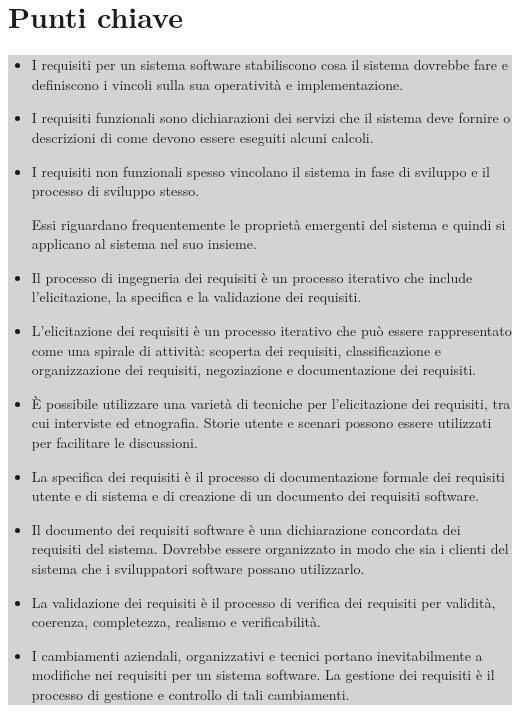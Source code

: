 \section{Punti chiave}
\begin{center}
\begin{minipage}{\textwidth}
\colorbox{lightgray}{
\parbox{\linewidth}{
\begin{itemize} 
    \item I requisiti per un sistema software stabiliscono cosa il sistema dovrebbe fare e definiscono i vincoli sulla sua operatività e implementazione.
    \item I requisiti funzionali sono dichiarazioni dei servizi che il sistema deve fornire o descrizioni di come devono essere eseguiti alcuni calcoli.
    \item I requisiti non funzionali spesso vincolano il sistema in fase di sviluppo e il processo di sviluppo stesso.
    
    Essi riguardano frequentemente le proprietà emergenti del sistema e quindi si applicano al sistema nel suo insieme.
    \item Il processo di ingegneria dei requisiti è un processo iterativo che include l'elicitazione, la specifica e la validazione dei requisiti.
    \item L'elicitazione dei requisiti è un processo iterativo che può essere rappresentato come una spirale di attività: scoperta dei requisiti, classificazione e organizzazione dei requisiti, negoziazione e documentazione dei requisiti.
    \item È possibile utilizzare una varietà di tecniche per l'elicitazione dei requisiti, tra cui interviste ed etnografia. Storie utente e scenari possono essere utilizzati per facilitare le discussioni.
    \item La specifica dei requisiti è il processo di documentazione formale dei requisiti utente e di sistema e di creazione di un documento dei requisiti software.
    \item Il documento dei requisiti software è una dichiarazione concordata dei requisiti del sistema. Dovrebbe essere organizzato in modo che sia i clienti del sistema che i sviluppatori software possano utilizzarlo.
    \item La validazione dei requisiti è il processo di verifica dei requisiti per validità, coerenza, completezza, realismo e verificabilità.
    \item I cambiamenti aziendali, organizzativi e tecnici portano inevitabilmente a modifiche nei requisiti per un sistema software. La gestione dei requisiti è il processo di gestione e controllo di tali cambiamenti.
\end{itemize}
}}
\end{minipage}
\end{center}